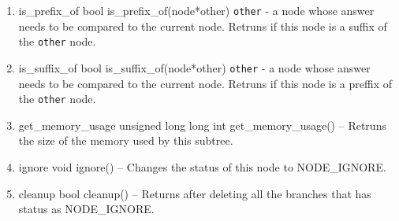 \begin{enumerate}
\begin{detail}
{Compares the answers of the two nodes and their children upto a level specified by \texttt{depth}. Returns \true if there are no inconsistancies in the answers, \false otherwise. } 
\end{detail}
\item \begin{detail}
{is\_prefix\_of}
{bool is\_prefix\_of(node*other)}
{\texttt{other} - a node whose answer needs to be compared to the current node.}
{Retruns \true if this node is a suffix of the \texttt{other} node. } 
\end{detail}
\item \begin{detail}
{is\_suffix\_of}
{bool is\_suffix\_of(node*other)}
{\texttt{other} - a node whose answer needs to be compared to the current node.}
{Retruns \true if this node is a preffix of the \texttt{other} node. } 
\end{detail}
\item \begin{detail}
{get\_memory\_usage}
{unsigned long long int get\_memory\_usage()}
{--}
{Retruns the size of the memory used by this subtree. } 
\end{detail}
\item \begin{detail}
{ignore}
{void ignore()}
{--}
{Changes the status of this node to NODE\_IGNORE. } 
\end{detail}
\item \begin{detail}
{cleanup}
{bool cleanup()}
{--}
{Returns \true after deleting all the branches that has status as NODE\_IGNORE. } 
\end{detail}
\end{enumerate}

